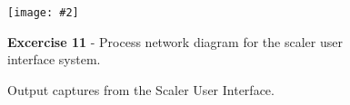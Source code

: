 \documentclass[10pt, a4paper]{article}
\newcommand{\figuremacro}[5]{
    \begin{figure}[#1]
        \centering
        \texttt{[image: \#2]}
        \caption[#3]{\textbf{#3}#4}
        \label{fig:#2}
    \end{figure}
}
\begin{document}
   \figuremacro{H}{UI}{Excercise 11}{ - Process network diagram for the scaler user interface system.}{1.0}
   
    \begin{figure}[h]
   	\centering
   	\hfil
   	\caption{Output captures from the Scaler User Interface.}
   	\label{uiOut}
   \end{figure}
\end{document}
